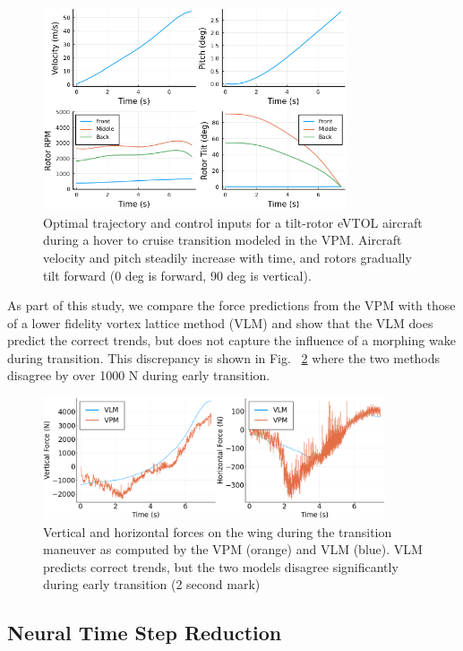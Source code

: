 \documentclass[12pt, letterpaper]{article}
\begin{document}
\begin{figure}[hbt!]
\centering
\includegraphics[width=0.8\textwidth]{figures/trajectory.png}
    \caption{Optimal trajectory and control inputs for a tilt-rotor eVTOL aircraft during a hover to cruise transition modeled in the VPM.  Aircraft velocity and pitch steadily increase with time, and rotors gradually tilt forward (0 deg is forward, 90 deg is vertical).}
\label{fig:trajectory}
\end{figure}

As part of this study, we compare the force predictions from the VPM with those of a lower fidelity vortex lattice method (VLM) and show that the VLM does predict the correct trends, but does not capture the influence of a morphing wake during transition.  This discrepancy is shown in Fig. ~\ref{fig:comparison} where the two methods disagree by over 1000 N during early transition.

\begin{figure}[hbt!]
\centering
\includegraphics[width=0.9\textwidth]{figures/comparison.png}
    \caption{Vertical and horizontal forces on the wing during the transition maneuver as computed by the VPM (orange) and VLM (blue).  VLM predicts correct trends, but the two models disagree significantly during early transition (2 second mark)}
\label{fig:comparison}
\end{figure}


\subsection{Neural Time Step Reduction}
\end{document}

